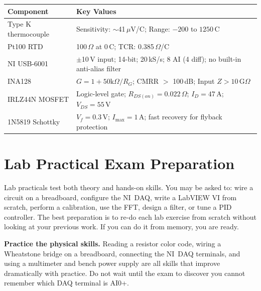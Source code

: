 \documentclass[11pt,letterpaper]{article}
\begin{document}
\begin{faqbox}
\small
\begin{tabularx}{\textwidth}{@{} l X @{}}
\toprule
\textbf{Component} & \textbf{Key Values} \\
\midrule
Type K thermocouple & Sensitivity: $\sim$41\,$\mu$V/\textdegree{}C; Range: $-200$ to $1250$\,\textdegree{}C \\
Pt100 RTD & 100\,$\Omega$ at 0\,\textdegree{}C; TCR: 0.385\,$\Omega$/\textdegree{}C \\
NI USB-6001 & $\pm$10\,V input; 14-bit; 20\,kS/s; 8 AI (4 diff); no built-in anti-alias filter \\
INA128 & $G = 1 + 50\text{k}\Omega/R_G$; CMRR $>$ 100\,dB; Input $Z > 10$\,G$\Omega$ \\
IRLZ44N MOSFET & Logic-level gate; $R_{DS(on)} = 0.022\,\Omega$; $I_D = 47$\,A; $V_{DS} = 55$\,V \\
1N5819 Schottky & $V_f = 0.3$\,V; $I_{\max} = 1$\,A; fast recovery for flyback protection \\
\bottomrule
\end{tabularx}
\end{faqbox}

\section{Lab Practical Exam Preparation}

\begin{faqbox}
Lab practicals test both theory and hands-on skills. You may be asked to: wire a circuit on a breadboard, configure the NI~DAQ, write a LabVIEW VI from scratch, perform a calibration, use the FFT, design a filter, or tune a PID controller. The best preparation is to re-do each lab exercise from scratch without looking at your previous work. If you can do it from memory, you are ready.
\end{faqbox}

\begin{tipbox}
\textbf{Practice the physical skills.} Reading a resistor color code, wiring a Wheatstone bridge on a breadboard, connecting the NI~DAQ terminals, and using a multimeter and bench power supply are all skills that improve dramatically with practice. Do not wait until the exam to discover you cannot remember which DAQ terminal is AI0+.
\end{tipbox}
\end{document}
